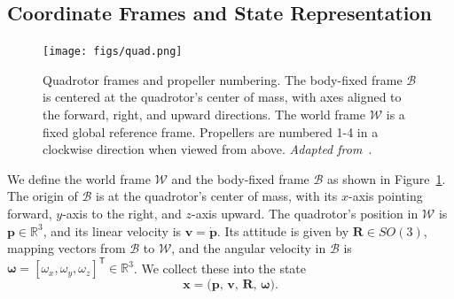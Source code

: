 \subsection{Coordinate Frames and State Representation}
\label{sec:quadrotor_state}
\begin{figure}[t]
  \centering
  \texttt{[image: figs/quad.png]}
  \caption[Quadrotor Frames]{%
    Quadrotor frames and propeller numbering. The body-fixed frame \(\mathcal{B}\) is centered at the quadrotor's center of mass, with axes aligned to the forward, right, and upward directions. The world frame \(\mathcal{W}\) is a fixed global reference frame. Propellers are numbered 1-4 in a clockwise direction when viewed from above. \textit{Adapted from}~\cite{kaufmann_benchmark_2022}.
  }
  \label{fig:quadrotor_frames}
\end{figure}
We define the world frame \(\mathcal{W}\) and the body-fixed frame \(\mathcal{B}\) as shown in Figure~\ref{fig:quadrotor_frames}. The origin of \(\mathcal{B}\) is at the quadrotor's center of mass, with its \(x\)-axis pointing forward, \(y\)-axis to the right, and \(z\)-axis upward. The quadrotor's position in \(\mathcal{W}\) is \(\mathbf{p} \in \mathbb{R}^3\), and its linear velocity is \(\mathbf{v} = \dot{\mathbf{p}}\). Its attitude is given by \(\mathbf{R} \in SO(3)\), mapping vectors from \(\mathcal{B}\) to \(\mathcal{W}\), and the angular velocity in \(\mathcal{B}\) is \(\boldsymbol{\omega} = [\omega_x,\omega_y,\omega_z]^\mathsf{T} \in \mathbb{R}^3\). We collect these into the state
\begin{equation}
\mathbf{x} = \bigl(\mathbf{p},\,\mathbf{v},\,\mathbf{R},\,\boldsymbol{\omega}\bigr).
\end{equation}

